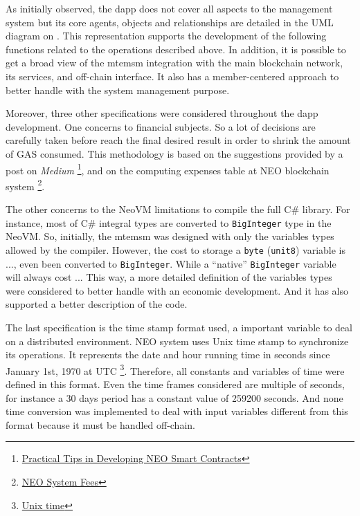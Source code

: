As initially observed, the \gls{dapp} does not cover all aspects to the management system but its core agents, objects and relationships are detailed in the UML diagram on .
This representation supports the development of the following functions related to the operations described above.
In addition, it is possible to get a broad view of the \gls{mtemsm} integration with the main blockchain network, its services, and off-chain interface.
It also has a member-centered approach to better handle with the system management purpose.

Moreover, three other specifications were considered throughout the \gls{dapp} development.
One concerns to financial subjects. So a lot of decisions are carefully taken before reach the final desired result in order to shrink the amount of GAS consumed.
This methodology is based on the suggestions provided by a post on \emph{Medium}%
\footnote{\href{https://medium.com/@gongxiaojing0825/practical-tips-in-developing-neo-smart-contract-a872a4f910c1}{Practical Tips in Developing NEO Smart Contracts}},
and on the computing expenses table at NEO blockchain system%
\footnote{\href{https://docs.neo.org/docs/en-us/sc/fees.html}{NEO System Fees}}.

The other concerns to the NeoVM limitations to compile the full C# library.
For instance, most of C# integral types are converted to \verb|BigInteger| type in the NeoVM.
So, initially, the \gls{mtemsm} was designed with only the variables types allowed by the compiler.
However, the cost to storage a \verb|byte| (\verb|unit8|) variable is ..., even been converted to \verb|BigInteger|.
While a ``native'' \verb|BigInteger| variable will always cost ...
This way, a more detailed definition of the variables types were considered to better handle with an economic development.
And it has also supported a better description of the code.

The last specification is the time stamp format used, a important variable to deal on a distributed environment.
NEO system uses Unix time stamp to synchronize its operations.
It represents the date and hour running time in seconds since January 1st, 1970 at UTC%
\footnote{\href{https://en.wikipedia.org/wiki/Unix_time}{Unix time}}.
Therefore, all constants and variables of time were defined in this format.
Even the time frames considered are multiple of seconds, for instance a 30 days period has a constant value of 259200 seconds.
And none time conversion was implemented to deal with input variables different from this format because it must be handled off-chain.


